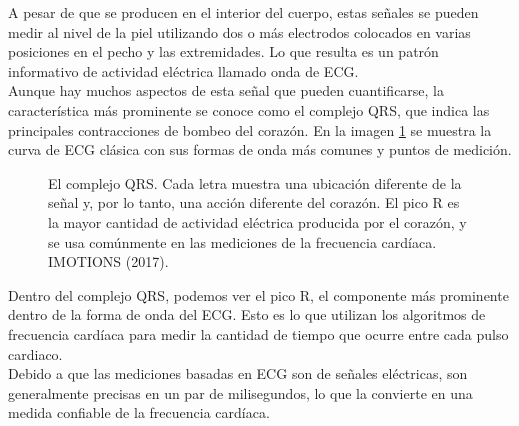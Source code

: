 		A pesar de que se producen en el interior del cuerpo, estas señales se pueden medir al nivel de la piel utilizando dos o más electrodos colocados en varias posiciones en el pecho y las extremidades. Lo que resulta es un patrón informativo de actividad eléctrica llamado onda de ECG. \\
		
		Aunque hay muchos aspectos de esta señal que pueden cuantificarse, la característica más prominente se conoce como el complejo QRS, que indica las principales contracciones de bombeo del corazón. En la imagen \ref{fig:ECGwave} se muestra la curva de ECG clásica con sus formas de onda más comunes y puntos de medición. \\
		
		\begin{figure}[htbp!]
			\centering
			\caption{El complejo QRS. Cada letra muestra una ubicación diferente de la señal y, por lo tanto, una acción diferente del corazón. El pico R es la mayor cantidad de actividad eléctrica producida por el corazón, y se usa comúnmente en las mediciones de la frecuencia cardíaca. IMOTIONS (2017).}
			\label{fig:ECGwave}
		\end{figure}
		
		Dentro del complejo QRS, podemos ver el pico R, el componente más prominente dentro de la forma de onda del ECG. Esto es lo que utilizan los algoritmos de frecuencia cardíaca para medir la cantidad de tiempo que ocurre entre cada pulso cardiaco. \\
		
		Debido a que las mediciones basadas en ECG son de señales eléctricas, son generalmente precisas en un par de milisegundos, lo que la convierte en una medida confiable de la frecuencia cardíaca. \cite{imotionsECG}
		
